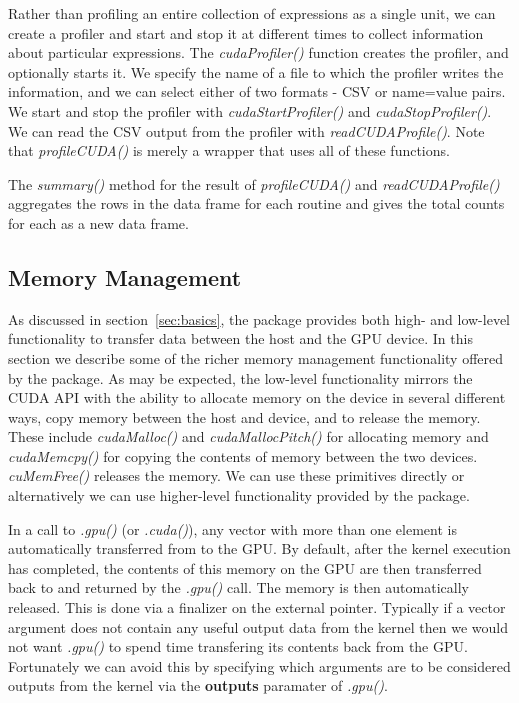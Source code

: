 \documentclass[article]{jss}
\def\R{\proglang{R}}
\def\Rpkg#1{\pkg{#1}}
\def\Rfunc#1{\textsl{#1()}}
\def\Rarg#1{\textbf{#1}}
\begin{document}
Rather than profiling an entire collection of \R{} expressions as a
single unit, we can create a profiler and start and stop it at
different times to collect information about particular \R{}
expressions.  The \Rfunc{cudaProfiler} function creates the profiler,
and optionally starts it.  We specify the name of a file to which the
profiler writes the information, and we can select either of two
formats - CSV or name=value pairs.  We start and stop the profiler
with \Rfunc{cudaStartProfiler} and \Rfunc{cudaStopProfiler}.  We can
read the CSV output from the profiler with \Rfunc{readCUDAProfile}.
Note that \Rfunc{profileCUDA} is merely a wrapper that uses all of these
functions.

The \Rfunc{summary} method for the result of \Rfunc{profileCUDA} and
\Rfunc{readCUDAProfile} aggregates the rows in the data frame for each
routine and gives the total counts for each as a new data frame.

\subsection{Memory Management}
As discussed in section~\ref{sec:basics}, the \Rpkg{RCUDA} package provides
both high- and low-level functionality to transfer data between the host
and the GPU device. In this section we describe some of the richer
memory management functionality offered by the package.
As may be expected, the low-level functionality mirrors the CUDA 
API with the ability to
allocate memory on the device in several different ways, copy memory
between the host and device, and to release the memory.  These include
\Rfunc{cudaMalloc} and \Rfunc{cudaMallocPitch} for allocating memory
and \Rfunc{cudaMemcpy} for copying the contents of memory between the
two devices.  \Rfunc{cuMemFree} releases the memory.
We can use these primitives directly or alternatively
we can use higher-level functionality provided by the package.

In a call to \Rfunc{.gpu} (or \Rfunc{.cuda}), any \R{} vector with
more than one element is automatically transferred from \R{} to the
GPU.  By default, after the kernel execution has completed, the
contents of this memory on the GPU are then transferred back to \R{}
and returned by the \Rfunc{.gpu} call.  The memory is then automatically
released. This is done via a finalizer on the external pointer.
Typically if a vector argument does not contain any useful output data from the
kernel then we would not want \Rfunc{.gpu} to spend time transfering
its contents back from the GPU. Fortunately we can avoid this by 
specifying which arguments are to be considered outputs from the kernel
via the \Rarg{outputs} paramater of \Rfunc{.gpu}.
\end{document}
